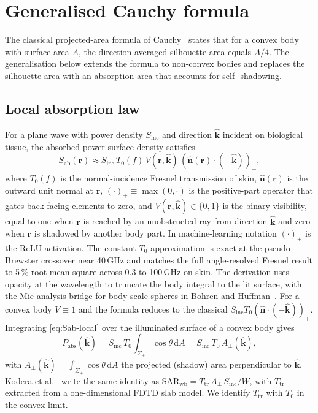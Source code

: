 \documentclass[journal,twocolumn,10pt]{IEEEtran}
\theoremstyle{plain}
\theoremstyle{remark}
\newcommand{\khat}{\hat{\bm{k}}}
\newcommand{\nhat}{\hat{\bm{n}}}
\newcommand{\rr}{\mathbf{r}}
\newcommand{\Sinc}{S_{\mathrm{inc}}}
\newcommand{\Sab}{S_{\mathrm{ab}}}
\newcommand{\Aperp}{A_\perp}
\newcommand{\diff}{\mathrm{d}}
\newcommand{\pospart}[1]{\left(#1\right)_{+}}
\newcommand{\Vis}{V}
\begin{document}
\section{Generalised Cauchy formula}\label{sec:cauchy}

The classical projected-area formula of Cauchy~\cite{Cauchy1841}
states that for a convex body with surface area $A$, the
direction-averaged silhouette area equals $A/4$. The generalisation
below extends the formula to non-convex bodies and replaces the
silhouette area with an absorption area that accounts for self-
shadowing.

\subsection{Local absorption law}

For a plane wave with power density $\Sinc$ and direction $\khat$
incident on biological tissue, the absorbed power surface density
satisfies
\begin{equation}\label{eq:Sab-local}
  \Sab(\rr) \approx \Sinc\,T_0(f)\,\Vis(\rr,\khat)\,
  \pospart{\nhat(\rr)\cdot(-\khat)},
\end{equation}
where $T_0(f)$ is the normal-incidence Fresnel transmission of skin,
$\nhat(\rr)$ is the outward unit normal at $\rr$, $(\cdot)_+ \equiv
\max(0,\cdot)$ is the positive-part operator that gates back-facing
elements to zero, and $\Vis(\rr,\khat) \in \{0,1\}$ is the binary
visibility, equal to one when $\rr$ is reached by an unobstructed ray
from direction $\khat$ and zero when $\rr$ is shadowed by another
body part. In machine-learning notation $(\cdot)_+$ is the ReLU
activation. The constant-$T_0$ approximation is exact at the
pseudo-Brewster crossover near 40\,GHz and matches the full
angle-resolved Fresnel result to 5\,\% root-mean-square across 0.3 to
100\,GHz on skin. The derivation uses opacity at the wavelength to
truncate the body integral to the lit surface, with the Mie-analysis
bridge for body-scale spheres in Bohren and Huffman~\cite{BohrenHuffman1983}.
For a convex body $\Vis \equiv 1$ and the formula reduces to the
classical $\Sinc T_0 \pospart{\nhat\cdot(-\khat)}$. Integrating
\eqref{eq:Sab-local} over the illuminated surface of a convex body
gives
\begin{equation}\label{eq:Pabs-convex}
  P_{\mathrm{abs}}(\khat) = \Sinc\,T_0\int_{\Sigma_+}\cos\theta\,\diff A
  = \Sinc\,T_0\,\Aperp(\khat),
\end{equation}
with $\Aperp(\khat) = \int_{\Sigma_+}\cos\theta\,\diff A$ the
projected (shadow) area perpendicular to $\khat$. Kodera
et al.~\cite{Kodera2024} write the same identity as
$\mathrm{SAR}_{\mathrm{wb}} = T_{\mathrm{tr}}\,A_\perp\,\Sinc/W$, with
$T_{\mathrm{tr}}$ extracted from a one-dimensional FDTD slab model.
We identify $T_{\mathrm{tr}}$ with $T_0$ in the convex limit.
\end{document}
